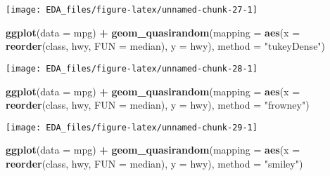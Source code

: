 \documentclass[]{book}
\newenvironment{Shaded}{\begin{snugshade}}{\end{snugshade}}
\newcommand{\DataTypeTok}[1]{\textcolor[rgb]{0.13,0.29,0.53}{#1}}
\newcommand{\KeywordTok}[1]{\textcolor[rgb]{0.13,0.29,0.53}{\textbf{#1}}}
\newcommand{\NormalTok}[1]{#1}
\newcommand{\OperatorTok}[1]{\textcolor[rgb]{0.81,0.36,0.00}{\textbf{#1}}}
\newcommand{\StringTok}[1]{\textcolor[rgb]{0.31,0.60,0.02}{#1}}
\theoremstyle{plain}
\theoremstyle{remark}
\theoremstyle{definition}
\theoremstyle{definition}
\theoremstyle{definition}
\theoremstyle{remark}
\begin{document}
\begin{center}\texttt{[image: EDA\_files/figure-latex/unnamed-chunk-27-1]} \end{center}

\begin{Shaded}
\begin{Highlighting}[]
\KeywordTok{ggplot}\NormalTok{(}\DataTypeTok{data =}\NormalTok{ mpg) }\OperatorTok{+}
\StringTok{  }\KeywordTok{geom_quasirandom}\NormalTok{(}\DataTypeTok{mapping =} \KeywordTok{aes}\NormalTok{(}\DataTypeTok{x =} \KeywordTok{reorder}\NormalTok{(class, hwy, }\DataTypeTok{FUN =}\NormalTok{ median),}
                                 \DataTypeTok{y =}\NormalTok{ hwy),}
                   \DataTypeTok{method =} \StringTok{"tukeyDense"}\NormalTok{)}
\end{Highlighting}
\end{Shaded}

\begin{center}\texttt{[image: EDA\_files/figure-latex/unnamed-chunk-28-1]} \end{center}

\begin{Shaded}
\begin{Highlighting}[]
\KeywordTok{ggplot}\NormalTok{(}\DataTypeTok{data =}\NormalTok{ mpg) }\OperatorTok{+}
\StringTok{  }\KeywordTok{geom_quasirandom}\NormalTok{(}\DataTypeTok{mapping =} \KeywordTok{aes}\NormalTok{(}\DataTypeTok{x =} \KeywordTok{reorder}\NormalTok{(class, hwy, }\DataTypeTok{FUN =}\NormalTok{ median),}
                                 \DataTypeTok{y =}\NormalTok{ hwy),}
                   \DataTypeTok{method =} \StringTok{"frowney"}\NormalTok{)}
\end{Highlighting}
\end{Shaded}

\begin{center}\texttt{[image: EDA\_files/figure-latex/unnamed-chunk-29-1]} \end{center}

\begin{Shaded}
\begin{Highlighting}[]
\KeywordTok{ggplot}\NormalTok{(}\DataTypeTok{data =}\NormalTok{ mpg) }\OperatorTok{+}
\StringTok{  }\KeywordTok{geom_quasirandom}\NormalTok{(}\DataTypeTok{mapping =} \KeywordTok{aes}\NormalTok{(}\DataTypeTok{x =} \KeywordTok{reorder}\NormalTok{(class, hwy, }\DataTypeTok{FUN =}\NormalTok{ median),}
                                 \DataTypeTok{y =}\NormalTok{ hwy),}
                   \DataTypeTok{method =} \StringTok{"smiley"}\NormalTok{)}
\end{Highlighting}
\end{Shaded}
\end{document}
